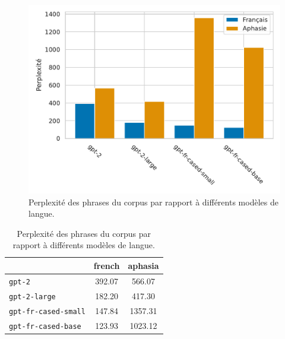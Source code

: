\begin{figure}[hbt]
  \begin{center}
    \includegraphics[width=.8\textwidth]{assets/python/perplexity.pdf}
  \end{center}
  \caption{Perplexité des phrases du corpus par rapport à différents modèles de langue.}
  \label{fig.perplexity}
\end{figure}
\begin{table}[hbt]
  \begin{center}
    \begin{tabular}{|l|c|c|}
      \cline{2-3}
      \multicolumn{1}{c|}{} &  french &  aphasia \\
      \hline
      \verb|gpt-2|              &  392.07 &   566.07 \\
      \hline
      \verb|gpt-2-large|        &  182.20 &   417.30 \\
      \hline
      \verb|gpt-fr-cased-small| &  147.84 &  1357.31 \\
      \hline
      \verb|gpt-fr-cased-base|  &  123.93 &  1023.12 \\
      \hline
      \end{tabular}
  \end{center}
  \caption{Perplexité des phrases du corpus par rapport à différents modèles de langue.}
  \label{tab.perplexity}
\end{table}


